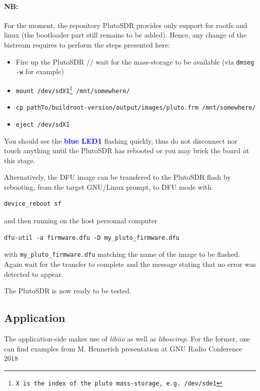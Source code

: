\documentclass[12pt,oneside]{article}
\begin{document}
\paragraph{NB:} For the moment, the repository PlutoSDR provides only support
for rootfs and linux (the bootloader part still remains to be added). Hence, any
change of the bistream requires to perform the steps presented here:

\begin{itemize}
	\item Fire up the PlutoSDR // wait for the mass-storage to be available (via
{\tt dmseg -w} for example)
	\item {\tt mount /dev/sdX1\footnote{X is the index of the pluto mass-storage, e.g.
/dev/sde1} /mnt/somewhere/}
	\item {\tt cp pathTo/buildroot-version/output/images/pluto.frm /mnt/somewhere/}
	\item {\tt eject /dev/sdX1}  %
\end{itemize}

You should see the {\bf \textcolor{blue}{blue LED1}} flashing quickly, thus do not disconnect
nor touch anything until the PlutoSDR has rebooted or you may brick the board at
this stage. 

Alternatively, the DFU image can be transfered to the PlutoSDR flash by rebooting,
from the target GNU/Linux prompt, to DFU mode with
{\footnotesize
\begin{verbatim}
device_reboot sf
\end{verbatim}
}
and then running on the host personnal computer
{\footnotesize
\begin{verbatim}
dfu-util -a firmware.dfu -D my_pluto_firmware.dfu
\end{verbatim}
}
with {\tt my\_pluto\_firmware.dfu} matching the name of the image to be flashed. Again wait for
the transfer to complete and the message stating that no error was detected to appear.

The PlutoSDR is now ready to be tested.

\subsection{Application}

The application-side makes use of \emph{libiio} as well as \emph{liboscimp}. For
the former, one can find examples from M. Hennerich presentation at GNU Radio
Conference 2018
\end{document}

